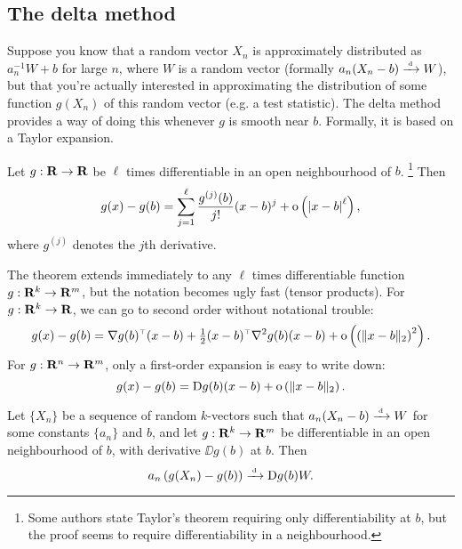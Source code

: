 \documentclass[11pt,letterpaper,reqno,oneside]{article}
\begin{document}



\subsection{The delta method}
\label{sec:modes_of_convergence:delta_method}

Suppose you know that a random vector $X_n$ is approximately distributed as $a_n^{-1} W + b$ for large $n$, where $W$ is a random vector (formally $a_n ( X_n - b ) \convd W$), but that you're actually interested in approximating the distribution of some function $g(X_n)$ of this random vector (e.g. a test statistic). The delta method provides a way of doing this whenever $g$ is smooth near $b$. Formally, it is based on a Taylor expansion.
%
\begin{theorem}
	Let $g : \R \to \R$ be $\ell$ times differentiable in an open neighbourhood of $b$.%
		\footnote{Some authors state Taylor's theorem requiring only differentiability at $b$, but the proof seems to require differentiability in a neighbourhood.}
	Then
	\begin{equation*}
		g(x) - g(b) 
		= \sum_{j=1}^\ell \frac{g^{(j)}(b)}{j!} ( x-b )^j
		+ \oo\left(\abs*{x-b}^\ell\right) ,
	\end{equation*}
	where $g^{(j)}$ denotes the $j$th derivative.
\end{theorem}
%
The theorem extends immediately to any $\ell$ times differentiable function $g : \R^k \to \R^m$, but the notation becomes ugly fast (tensor products). For $g : \R^k \to \R$, we can go to second order without notational trouble:
%
\begin{equation*}
	g(x) - g(b)
	= \nabla g(b)^\trans (x-b)
	+ \tfrac{1}{2} (x-b)^\trans \nabla^2 g(b) (x-b)
	+ \oo\left( \left(\norm{x-b}_2\right)^2 \right) .
\end{equation*}
%
For $g : \R^n \to \R^m$, only a first-order expansion is easy to write down:
%
\begin{equation*}
	g(x) - g(b)
	= \DD g(b) (x-b)
	+ \oo\left( \norm{x-b}_2 \right) .
\end{equation*}


\begin{proposition}
	\label{proposition:delta_method}
	Let $\{ X_n \}$ be a sequence of random $k$-vectors such that $a_n ( X_n - b ) \convd W$ for some constants $\{ a_n \}$ and $b$, and let $g: \R^k \to \R^m$ be differentiable in an open neighbourhood of $b$, with derivative $\DD g(b)$ at $b$. Then
	\begin{equation*}
		a_n \left( g(X_n) - g(b) \right)
		\convd \DD g(b) W .
	\end{equation*}
\end{proposition}
\end{document}
